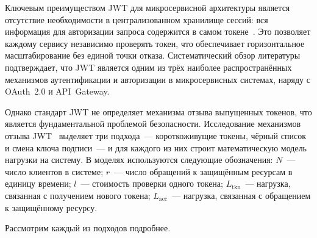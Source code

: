 Ключевым преимуществом JWT для микросервисной архитектуры
является отсутствие необходимости в централизованном хранилище сессий:
вся информация для авторизации запроса содержится в самом токене~\cite{Janoky2018}.
Это позволяет каждому сервису независимо проверять токен,
что обеспечивает горизонтальное масштабирование без единой точки отказа.
Систематический обзор литературы~\cite{Almeida2022}
подтверждает, что JWT является одним из трёх наиболее распространённых механизмов
аутентификации и авторизации в микросервисных системах,
наряду с OAuth~2.0 и API~Gateway.

Однако стандарт JWT не определяет механизма отзыва выпущенных токенов,
что является фундаментальной проблемой безопасности.
Исследование механизмов отзыва JWT~\cite{Janoky2018} выделяет
три подхода~---
короткоживущие токены, чёрный список и смена ключа подписи~---
и для каждого из них строит математическую модель нагрузки на систему.
В моделях используются следующие обозначения:
$N$~--- число клиентов в системе;
$r$~--- число обращений к защищённым ресурсам в единицу времени;
$l$~--- стоимость проверки одного токена;
$L_{\text{tkn}}$~--- нагрузка, связанная с получением нового токена;
$L_{\text{acc}}$~--- нагрузка, связанная с обращением к защищённому ресурсу.

Рассмотрим каждый из подходов подробнее.

